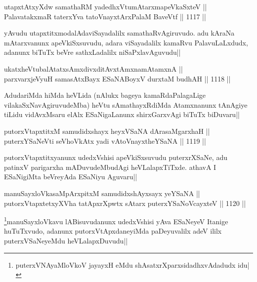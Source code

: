 
\begin{shl}
utapxtAtxyXdw samathaRM yadedhxVtumAtarxmapeVkaSxteV ||  \\
PalavatakxmaR taterxYva tatoV\s nayxtArxPalaM BaveVtf ||  1117 ||  
\end{shl}

\begin{artha}
yAvudu utapxtitxmodalAdaviSayadalilx samathaRvAgiruvudo. adu kAraNa mAtarxvanunx 
apeVkiSxsuvudu, adara viSayadalilx kamaRvu PalavuLaLxdudx, adanunx biTuTx beVre 
sathxLadalilx niSaPxlavAguvudu||
\end{artha}

\begin{shl}
ukatxheVtubalAtatxsAmxdivxditAvx\s \s tAmxnamAtamxnA ||  \\
parxvarxjeVyuH samasAtxBayx ESaNABoyxV durxtaM budhAH ||  1118 ||  
\end{shl}

\begin{artha}
AdudariMda hiMda heVLida (nAlukx bageya kamaRdaPalagaLige vilakaSxNavAgiruvudeMba) heVtu sAmathayxRdiMda Atamxnanunx tAnAgiye tiLidu vidAvxMsaru elAlx ESaNigaLanunx shirxGarxvAgi biTuTx biDuvaru||
\end{artha}


\begin{shl}
putorxVtapxtitxM samudidxshayx heyxVSaNA dArasaMgarxhaH || \\
puterxYSaNeVti seVhoVkAtx yadi vA\s toV\s nayxtheYSaNA ||  1119 ||  
\end{shl}

\begin{artha}
putorxVtapxtitxyanunx udedxVshisi apeVkiSxsuvudu puterxrXSaNe, adu patinxV parigarxha mADuvudeMbudAgi heVLalapxTiTxde. athavA I ESaNigiMta beVreyAda ESaNiyu Aguvaru|| 
\end{artha}


\begin{shl}
manuSayxloVkasaMpArxpitxM samudidxshAyxsayx yeYSaNA || \\
putorxVtapxtetxyXVha tatApxrXpwtx sA\s tarx puterxYSaNoVcayxteV ||  1120 ||  
\end{shl}

\begin{artha}
\footnote{puterxVNAyaMloVkoV jayayxH eMdu shAsatxrXparxsidadhxvAdadudx idu|}manuSayxloVkavu lABisuvudanunx udedxVshisi yAva ESaNeyeV Itanige huTuTxvudo, adanunx putorxVtApxdaneyiMda paDeyuvalilx adeV ililx puterxVSaNeyeMdu heVLalapxDuvudu||
\end{artha}

